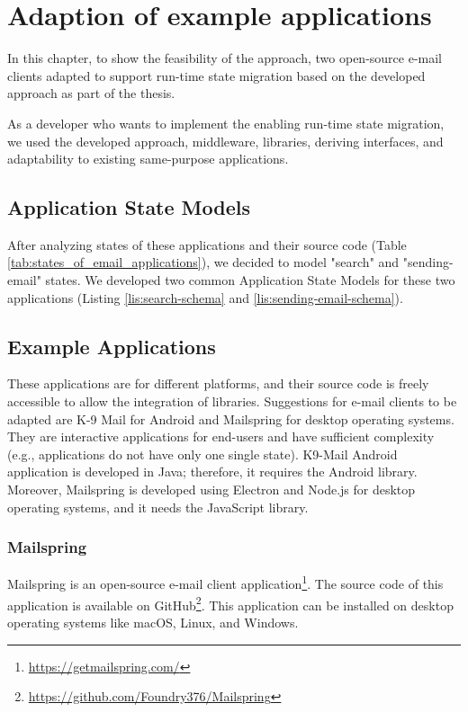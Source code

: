 \chapter{Adaption of example applications}
\label{ch:adaption}
In this chapter, to show the feasibility of the approach, two open-source e-mail clients adapted to support run-time state migration based on the developed approach as part of the thesis.

As a developer who wants to implement the enabling run-time state migration, we used the developed approach, middleware, libraries, deriving interfaces, and adaptability to existing same-purpose applications. 

\section{Application State Models}
After analyzing states of these applications and their source code (Table \ref{tab:states_of_email_applications}), we decided to model "search" and "sending-email" states. We developed two common Application State Models for these two applications (Listing \ref{lis:search-schema} and \ref{lis:sending-email-schema}). 



\section{Example Applications}
These applications are for different platforms, and their source code is freely accessible to allow the integration of libraries. 
Suggestions for e-mail clients to be adapted are K-9 Mail for Android and Mailspring for desktop operating systems. They are interactive applications for end-users and have sufficient complexity (e.g., applications do not have only one single state).
K9-Mail Android application is developed in Java; therefore, it requires the Android library. Moreover, Mailspring is developed using Electron and Node.js for desktop operating systems, and it needs the JavaScript library.

\subsection{Mailspring}
Mailspring is an open-source e-mail client application\footnote{\url{https://getmailspring.com/}}. The source code of this application is available on GitHub\footnote{\url{https://github.com/Foundry376/Mailspring}}. This application can be installed on desktop operating systems like macOS, Linux, and Windows.
